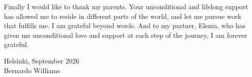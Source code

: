 \begin{acknowledgements}
Finally I would like to thank my parents. Your unconditional and lifelong support has allowed me to reside in different parts of the world, and let me pursue work that fulfills me.
I am grateful beyond words.
And to my partner, Elenia, who has given me unconditional love and support at each step of the journey, I am forever grateful. 


  
\begin{flushright}
  Helsinki, September 2026\\
  Bernardo Williams
\end{flushright}
\end{acknowledgements}
